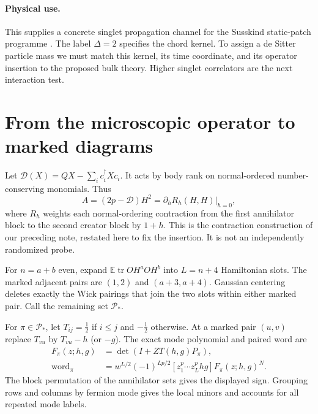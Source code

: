 \documentclass[11pt,a4paper]{article}
\newcommand{\tr}{\operatorname{tr}}
\newcommand{\E}{\mathbb E}
\begin{document}
\paragraph{Physical use.}
This supplies a concrete singlet propagation channel for the Susskind
static-patch programme \cite{mss}. The label $\Delta=2$ specifies the
chord kernel. To assign a de Sitter particle mass we must match this
kernel, its time coordinate, and its operator insertion to the proposed
bulk theory. Higher singlet correlators are the next interaction test.

\newpage
\appendix
\section{From the microscopic operator to marked diagrams}
Let $\mathcal D(X)=QX-\sum_i c_i^\dagger Xc_i$. It acts by body rank
on normal-ordered number-conserving monomials. Thus
\begin{equation}
 A=(2p-\mathcal D)H^2
   =\left.\partial_h R_h(H,H)\right|_{h=0},
\end{equation}
where $R_h$ weights each normal-ordering contraction from the first
annihilator block to the second creator block by $1+h$.
This is the contraction construction of our preceding note, restated here
to fix the insertion. It is not an independently randomized probe.

For $n=a+b$ even, expand $\E\tr O H^a O H^b$ into $L=n+4$
Hamiltonian slots. The marked adjacent pairs are $(1,2)$ and
$(a+3,a+4)$. Gaussian centering deletes exactly the Wick pairings
that join the two slots within either marked pair. Call the remaining
set $\mathcal P_*$.

For $\pi\in\mathcal P_*$, let
$T_{ij}=\frac12$ if $i\le j$ and $-\frac12$ otherwise. At a marked
pair $(u,v)$ replace $T_{vu}$ by $T_{vu}-h$ (or $-g$).
The exact mode polynomial and paired word are
\begin{align}
 F_\pi(z;h,g)&=\det(I+ZT(h,g)P_\pi),\\
 \text{word}_\pi&=w^{L/2}(-1)^{Lp/2}
 [z_1^p\cdots z_L^p hg]F_\pi(z;h,g)^N.\label{finite}
\end{align}
The block permutation of the annihilator sets gives the displayed sign.
Grouping rows and columns by fermion mode gives the local minors and
accounts for all repeated mode labels.
\end{document}
